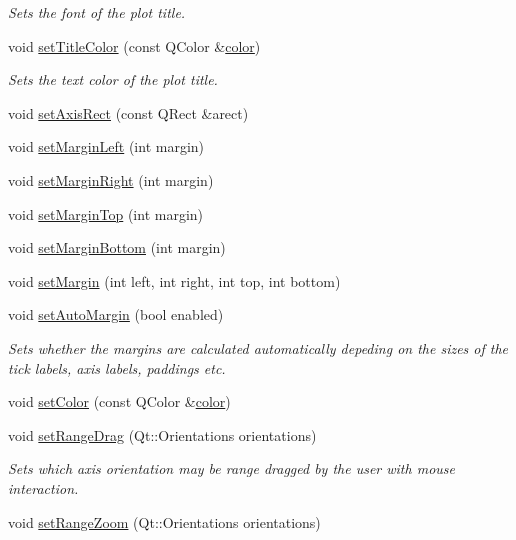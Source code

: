 \begin{DoxyCompactItemize}
\begin{DoxyCompactList}\small\item\em Sets the font of the plot title. \end{DoxyCompactList}\item 
void \hyperlink{a00116_a57693e1334130e47dae06f8bd226328b}{set\+Title\+Color} (const Q\+Color \&\hyperlink{a00116_ae35093fbf4f645dcefd930ca8c68b622}{color})
\begin{DoxyCompactList}\small\item\em Sets the text color of the plot title. \end{DoxyCompactList}\item 
void \hyperlink{a00116_a5de3a26b172b17e1f0e35bfc596d9d4d}{set\+Axis\+Rect} (const Q\+Rect \&arect)
\item 
void \hyperlink{a00116_a3be3a999be642fc336d4f4bf8299b27a}{set\+Margin\+Left} (int margin)
\item 
void \hyperlink{a00116_a1822d02903f715e6910c0b55dd1506b9}{set\+Margin\+Right} (int margin)
\item 
void \hyperlink{a00116_a3078bfcda0a3eda7782d8ca01f71ad7e}{set\+Margin\+Top} (int margin)
\item 
void \hyperlink{a00116_a87d42c0b0a224f9f9e43013fff4199d9}{set\+Margin\+Bottom} (int margin)
\item 
void \hyperlink{a00116_a870fac53de3ba7bd9d71b45238b0eaeb}{set\+Margin} (int left, int right, int top, int bottom)
\item 
void \hyperlink{a00116_aed5bb30c9b04c1d0103ab8ef7190f23a}{set\+Auto\+Margin} (bool enabled)
\begin{DoxyCompactList}\small\item\em Sets whether the margins are calculated automatically depeding on the sizes of the tick labels, axis labels, paddings etc. \end{DoxyCompactList}\item 
void \hyperlink{a00116_a858bbcf98637471449e438304a00624b}{set\+Color} (const Q\+Color \&\hyperlink{a00116_ae35093fbf4f645dcefd930ca8c68b622}{color})
\item 
void \hyperlink{a00116_aa0e1c44295da2706d0f12ad48f64b806}{set\+Range\+Drag} (Qt\+::\+Orientations orientations)
\begin{DoxyCompactList}\small\item\em Sets which axis orientation may be range dragged by the user with mouse interaction. \end{DoxyCompactList}\item 
void \hyperlink{a00116_ad4a0919e471549a2daea517ce6538ad8}{set\+Range\+Zoom} (Qt\+::\+Orientations orientations)

\end{DoxyCompactItemize}
